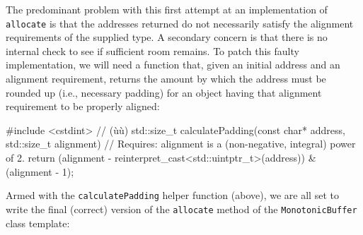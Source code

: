 \noindent The predominant problem with this first attempt at an implementation of
\lstinline!allocate! is that the addresses returned do not necessarily
satisfy the alignment requirements of the supplied type. A
secondary concern is that there is no internal check to see if
sufficient room remains. To patch this faulty implementation,
we will need a function that, given an initial address and an alignment
requirement, returns the amount by which the address must be rounded up
(i.e., necessary padding) for an object having that alignment
requirement to be properly aligned:

\begin{emcppslisting}[emcppsbatch=e3]
#include <cstdint>  // (ù{}ù)
std::size_t calculatePadding(const char* address, std::size_t alignment)
    // Requires: alignment is a (non-negative, integral) power of 2.
{
    return (alignment - reinterpret_cast<std::uintptr_t>(address)) & 
           (alignment - 1);
}
\end{emcppslisting}
    
\noindent Armed with the
\lstinline!calculatePadding! helper function (above), we are all set to write the final (correct) version of the \lstinline!allocate! method of the \lstinline!MonotonicBuffer! class template:

